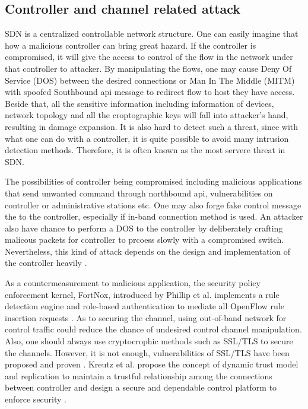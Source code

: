 \subsection{Controller and channel related attack}
SDN is a centralized controllable network structure. One can easily imagine that how a malicious controller can bring great hazard. If the controller is compromised, it will give the access to control of the flow in the network under that controller to attacker. By manipulating the flows, one may cause Deny Of Service (DOS) between the desired connections or Man In The Middle (MITM) with spoofed Southbound api message to redirect flow to host they have access. Beside that, all the sensitive information including information of devices, network topology and all the croptographic keys will fall into attacker's hand, resulting in damage expansion. It is also hard to detect such a threat, since with what one can do with a controller, it is quite possible to avoid many intrusion detection methods. Therefore, it is often known as the most servere threat in SDN.

The possibilities of controller being compromised including malicious applications that send unwanted command through northbound api, vulnerabilities on controller or administrative stations etc. One may also forge fake control message the to the controller, especially if in-band connection method is used. An attacker also have chance to perform a DOS to the controller by deliberately crafting malicous packets for controller to prcoess slowly with a compromised switch. Nevertheless, this kind of attack depends on the design and implementation of the controller heavily \cite{AAS14}.

As a countermeasurement to malicious application, the security policy enforcement kernel, FortNox, introduced by Phillip et al. implements a rule detection engine and role-based authentication to mediate all OpenFlow rule insertion requests \cite{PSYFTG12}. As to securing the channel, using out-of-band network for control traffic could reduce the chance of undesired control channel manipulation. Also, one should always use cryptocrophic methods such as SSL/TLS to secure the channels. However, it is not enough, vulnerabilities of SSL/TLS have been proposed and proven \cite{HRKC12}. Kreutz et al. propose the concept of dynamic trust model and replication to maintain a trustful relationship among the connections between controller and design a secure and dependable control platform to enforce security \cite{KDFRV13}. 

